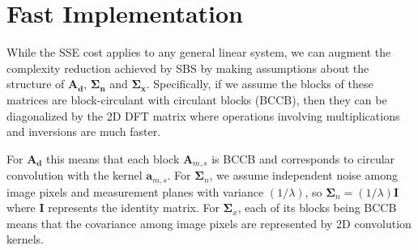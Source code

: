 \documentclass{article}
\providecommand{\norm}[1]{\left\lVert#1\right\rVert}
\DeclareMathOperator*{\argmin}{arg\,min}
\begin{document}


\section{Fast Implementation}
While the SSE cost applies to any general linear system, we can augment the
complexity reduction achieved by SBS by making assumptions about the structure
of $\bm{A}_{\bm{d}}$, $\bm{\Sigma}_{\bm{n}}$ and $\bm{\Sigma}_{\bm{x}}$.
Specifically, if we assume the blocks of these matrices are block-circulant with
circulant blocks (BCCB), then they can be diagonalized by the 2D DFT matrix
where operations involving multiplications and inversions are much faster.

For $\bm{A}_{\bm{d}}$ this means that each block $\bm A_{m,s}$ is BCCB and
corresponds to circular convolution with the kernel $\bm a_{m,s}$. For $\bm
\Sigma_n$, we assume independent noise among image pixels and measurement planes
with variance $(1/\lambda)$, so $\bm \Sigma_n=(1/\lambda) \bm I$ where $\bm I$
represents the identity matrix. For $\bm \Sigma_x$, each of its blocks being
BCCB means that the covariance among image pixels are represented by 2D
convolution kernels.
\end{document}
